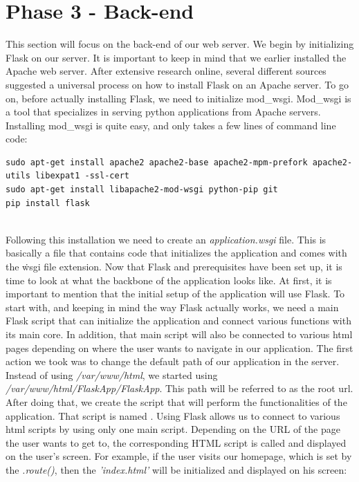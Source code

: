 \section{Phase 3 - Back-end}
This section will focus on the back-end of our web server. We begin by initializing Flask on our server. It is important to keep in mind that we earlier installed the Apache web server. After extensive research online, several different sources suggested a universal process on how to install Flask on an Apache server. To go on, before actually installing Flask, we need to initialize mod\_wsgi. Mod\_wsgi is a tool that specializes in serving python applications from Apache servers. Installing mod\_wsgi is quite easy, and only takes a few lines of command line code: \\

\begin{lstlisting}
sudo apt-get install apache2 apache2-base apache2-mpm-prefork apache2-utils libexpat1 -ssl-cert
sudo apt-get install libapache2-mod-wsgi python-pip git
pip install flask
\end{lstlisting}\\

Following this installation we need to create an \textit{application.wsgi} file. This is basically a file that contains code that initializes the application and comes with the \.wsgi file extension. 
Now that Flask and prerequisites have been set up, it is time to look at what the backbone of the application looks like. At first, it is important to mention that the initial setup of the application will use Flask. To start with, and keeping in mind the way Flask actually works, we need a main Flask script that can initialize the application and connect various functions with its main core. In addition, that main script will also be connected to various html pages depending on where the user wants to navigate in our application.
The first action we took was to change the default path of our application in the server. Instead of using \textit{/var/www/html}, we started using \textit{/var/www/html/FlaskApp/FlaskApp}. This path will be referred to as the root url. After doing that, we create the script that will perform the functionalities of the application. That script is named . Using Flask allows us to connect to various html scripts by using  only one main script. Depending on the URL of the page the user wants to get to, the corresponding HTML script is called and displayed on the user's screen. For example, if the user visits our homepage, which is set by the \textit{\@app.route()}, then the \textit{'index.html'} will be initialized and displayed on his screen:\\

